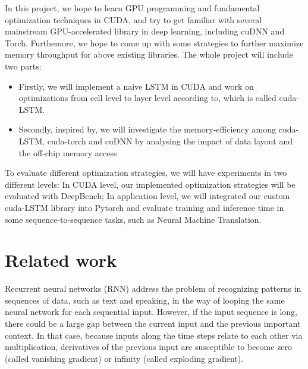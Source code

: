 \documentclass{article}
\begin{document}
In this project, we hope to learn GPU programming and fundamental optimization techniques in CUDA, and try to get familiar with several mainstream GPU-accelerated library in deep learning, including cuDNN and Torch. Furthemore, we hope to come up with some strategies to further maximize memory throughput for above existing libraries. The whole project will include two parts:

\begin{itemize}
  \item Firstly, we will implement a naive LSTM in CUDA and work on optimizations from cell level to layer level according to\cite{appleyard2016optimizing}, which is called cuda-LSTM.
  \item Secondly, inspired by\cite{li2016optimizing}, we will investigate the memory-efficiency among cuda-LSTM, cuda-torch\cite{PyTorch} and cuDNN by analysing the impact of data layout and the off-chip memory access

\end{itemize}


To evaluate different optimization strategies, we will have experiments in two different levels: In CUDA level, our implemented optimization strategies will be evaluated with DeepBench\cite{DeepBench}; In application level, we will integrated our custom cuda-LSTM library into Pytorch and evaluate training and inference time in some sequence-to-sequence tasks, such as Neural Machine Translation\cite{luong2015effective}.



\section{Related work}

Recurrent neural networks (RNN) address the problem of recognizing patterns in sequences of data, such as text and speaking, in the way of looping the same neural network for each sequential input. However, if the input sequence is long, there could be a large gap between the current input and the previous important context. In that case, because inputs along the time steps relate to each other via multiplication, derivatives of the previous input are susceptible to become zero (called vanishing gradient) or infinity (called exploding gradient). 
\end{document}
